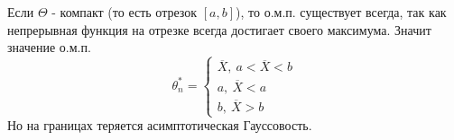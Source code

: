 \begin{example}
    Если \(\Theta\) - компакт (то есть отрезок \([a, b]\)), то о.м.п. существует
    всегда, так как непрерывная функция на отрезке всегда достигает своего максимума.
    Значит значение о.м.п.
    \begin{equation*}
        \theta^*_n = \begin{cases}
            \overline{X},\ a < \overline{X} < b \\
            a,\ \overline{X} < a \\
            b,\ \overline{X} > b
        \end{cases}
    \end{equation*}
    Но на границах теряется асимптотическая Гауссовость.
\end{example}
